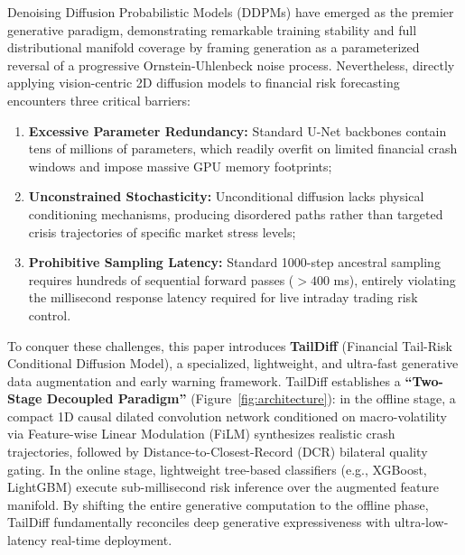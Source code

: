 \documentclass[preprint,12pt,authoryear]{elsarticle}
\begin{document}
Denoising Diffusion Probabilistic Models (DDPMs) \citep{ho2020denoising,song2020score} have emerged as the premier generative paradigm, demonstrating remarkable training stability and full distributional manifold coverage by framing generation as a parameterized reversal of a progressive Ornstein-Uhlenbeck noise process. Nevertheless, directly applying vision-centric 2D diffusion models to financial risk forecasting encounters three critical barriers:
\begin{enumerate}[label=(\arabic*),leftmargin=1.8em]
    \item \textbf{Excessive Parameter Redundancy:} Standard U-Net backbones contain tens of millions of parameters, which readily overfit on limited financial crash windows and impose massive GPU memory footprints;
    \item \textbf{Unconstrained Stochasticity:} Unconditional diffusion lacks physical conditioning mechanisms, producing disordered paths rather than targeted crisis trajectories of specific market stress levels;
    \item \textbf{Prohibitive Sampling Latency:} Standard 1000-step ancestral sampling requires hundreds of sequential forward passes ($>400$ ms), entirely violating the millisecond response latency required for live intraday trading risk control.
\end{enumerate}

To conquer these challenges, this paper introduces \textbf{TailDiff} (Financial Tail-Risk Conditional Diffusion Model), a specialized, lightweight, and ultra-fast generative data augmentation and early warning framework. TailDiff establishes a \textbf{``Two-Stage Decoupled Paradigm''} (Figure~\ref{fig:architecture}): in the offline stage, a compact 1D causal dilated convolution network conditioned on macro-volatility via Feature-wise Linear Modulation (FiLM) synthesizes realistic crash trajectories, followed by Distance-to-Closest-Record (DCR) bilateral quality gating. In the online stage, lightweight tree-based classifiers (e.g., XGBoost, LightGBM) execute sub-millisecond risk inference over the augmented feature manifold. By shifting the entire generative computation to the offline phase, TailDiff fundamentally reconciles deep generative expressiveness with ultra-low-latency real-time deployment.
\end{document}
